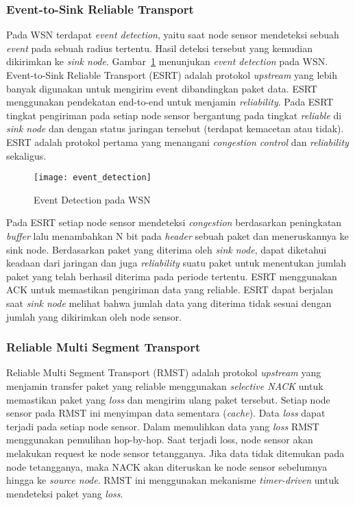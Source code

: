 \subsubsection{Event-to-Sink Reliable Transport}
Pada WSN terdapat \textit{event detection}, yaitu saat node sensor mendeteksi sebuah \textit{event} pada sebuah radius tertentu. Hasil deteksi tersebut yang kemudian dikirimkan ke \textit{sink node}. Gambar~\ref{fig:event_detection} menunjukan \textit{event detection} pada WSN. Event-to-Sink Reliable Transport (ESRT) adalah protokol \textit{upstream} yang lebih banyak digunakan untuk mengirim event dibandingkan paket data. ESRT menggunakan pendekatan end-to-end untuk menjamin \textit{reliability}. Pada ESRT tingkat pengiriman pada setiap node sensor bergantung pada tingkat \textit{reliable} di \textit{sink node} dan dengan status jaringan tersebut (terdapat kemacetan atau tidak). ESRT adalah protokol pertama yang menangani \textit{congestion control} dan \textit{reliability} sekaligus. 

\begin{figure} [H]
	\centering  
	\texttt{[image: event\_detection]}  
	\caption[Event Detection pada WSN]{Event Detection pada WSN} 
	\label{fig:event_detection} 
\end{figure}

Pada ESRT setiap node sensor mendeteksi \textit{congestion} berdasarkan peningkatan \textit{buffer} lalu menambahkan N bit pada \textit{header} sebuah paket dan meneruskannya ke sink node. Berdasarkan paket yang diterima oleh \textit{sink node}, dapat diketahui keadaan dari jaringan dan juga \textit{reliability} suatu paket untuk menentukan jumlah paket yang telah berhasil diterima pada periode tertentu. ESRT menggunakan ACK untuk memastikan pengiriman data yang reliable. ESRT dapat berjalan saat \textit{sink node} melihat bahwa jumlah data yang diterima tidak sesuai dengan jumlah yang dikirimkan oleh node sensor.

\subsubsection{Reliable Multi Segment Transport}
Reliable Multi Segment Transport (RMST) adalah protokol \textit{upstream} yang menjamin transfer paket yang reliable menggunakan \textit{selective NACK} untuk memastikan paket yang \textit{loss} dan mengirim ulang paket tersebut. Setiap node sensor pada RMST ini menyimpan data sementara (\textit{cache}). Data \textit{loss} dapat terjadi pada setiap node sensor. Dalam memulihkan data yang \textit{loss} RMST menggunakan pemulihan hop-by-hop. Saat terjadi loss, node sensor akan melakukan request ke node sensor tetangganya. Jika data tidak ditemukan pada node tetangganya, maka NACK akan diteruskan ke node sensor sebelumnya hingga ke \textit{source node}. RMST ini menggunakan mekanisme \textit{timer-driven} untuk mendeteksi paket yang \textit{loss}. 

